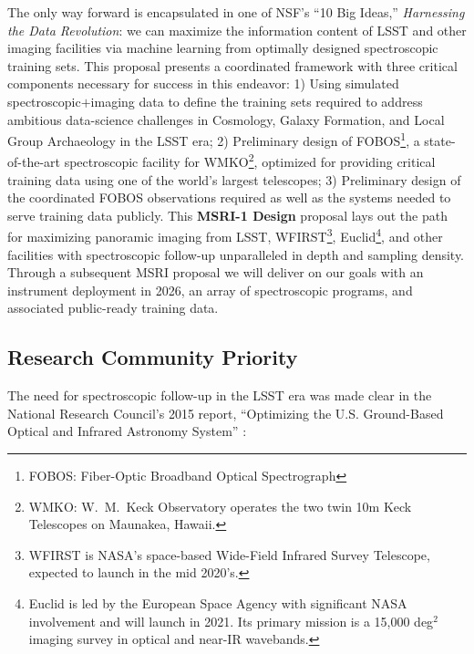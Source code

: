 \documentclass[oneside,11pt]{amsart}
\newcommand{\comment}[2][todo]{{\color{#1}[[{\bf #2}]]}}
\begin{document}
The only way forward is encapsulated in one of NSF's ``10 Big Ideas,''
\emph{Harnessing the Data Revolution}: we can maximize the information
content of LSST and other imaging facilities via machine learning from
optimally designed spectroscopic training sets.  This proposal presents
a coordinated framework with three critical components necessary for
success in this endeavor: 1) Using simulated spectroscopic$+$imaging
data to define the training sets required to address ambitious
data-science challenges in Cosmology, Galaxy Formation, and Local Group
Archaeology in the LSST era; 2) Preliminary design of
FOBOS\footnote{FOBOS: Fiber-Optic Broadband Optical Spectrograph}, a
state-of-the-art spectroscopic facility for WMKO\footnote{WMKO: W.~M.\ Keck Observatory operates the two twin 10m Keck Telescopes on
Maunakea, Hawaii.}, optimized for providing critical training data using
one of the world's largest telescopes; 3) Preliminary design of the
coordinated FOBOS observations required as well as the systems needed to
serve training data publicly.  This {\bf MSRI-1 Design} proposal lays
out the path for maximizing panoramic imaging from LSST,
WFIRST\footnote{WFIRST is NASA's space-based Wide-Field Infrared Survey
Telescope, expected to launch in the mid 2020's.},
Euclid\footnote{Euclid is led by the European Space Agency with
significant NASA involvement and will launch in 2021. Its primary
mission is a 15,000 deg$^2$ imaging survey in optical and near-IR
wavebands.}, and other facilities with spectroscopic follow-up
unparalleled in depth and sampling density.  Through a subsequent MSRI
proposal we will deliver on our goals with an instrument deployment in
2026, an array of spectroscopic programs, and associated public-ready
training data.

\subsection{Research Community Priority} 
\label{sec:community}

The need for spectroscopic follow-up in the LSST era was made clear in
the National Research Council's 2015 report, ``Optimizing the U.S.
Ground-Based Optical and Infrared Astronomy System'' \citep{NAP21722}:
%
\noindent{}
\end{document}
